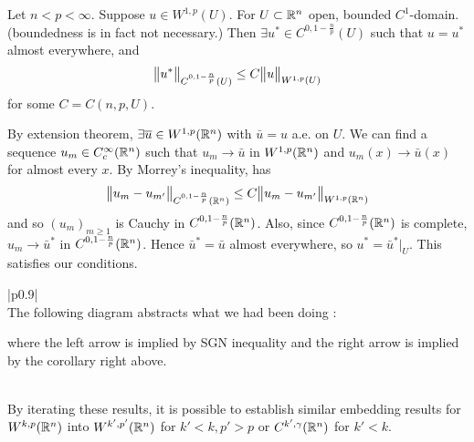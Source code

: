 \documentclass[12pt,a4paper]{report}
\newenvironment{proof}
{\begin{changemargin}{1cm}{0.5cm} 
	}%
	{\end{changemargin}
}
\begin{document}
\corr Let $n< p < \infty$. Suppose $u \in W^{1,p} (U)$. For $U\subset \mathbb{R}^n$ open, bounded $C^{1}$-domain. (boundedness is in fact not necessary.) Then $\exists u^* \in C^{0,1-\frac{n}{p}}(U)$ such that $u = u^*$ almost everywhere, and
\begin{align*}
\bigl\lVert u^*\bigr\rVert_{C^{0,1-\frac{n}{p}}(U)} \leq C \bigl\lVert u\bigr\rVert_{W^{1,p}(U)}
\end{align*}
for some $C = C(n,p,U)$.
\begin{proof}
\pf By extension theorem, $\exists \overline{u} \in W^{1,p}(\mathbb{R}^n)$ with $\bar{u} =u$ a.e. on $U$. We can find a sequence $u_m \in C_c^{\infty}(\mathbb{R}^n)$ such that $u_m \rightarrow \bar{u}$ in $W^{1,p}(\mathbb{R}^n)$ and $u_m(x) \rightarrow \bar{u}(x)$ for almost every $x$. By Morrey's inequality, has
\begin{align*}
\bigl\lVert u_m -u_{m'}\bigr\rVert_{C^{0,1-\frac{n}{p}}(\mathbb{R}^n)} \leq C \bigl\lVert u_m - u_{m'}\bigr\rVert_{W^{1,p}(\mathbb{R}^n)}
\end{align*}
and so $(u_m)_{m\geq 1}$ is Cauchy in $C^{0, 1-\frac{n}{p}}(\mathbb{R}^n)$. Also, since $C^{0, 1-\frac{n}{p}}(\mathbb{R}^n)$ is complete, $u_m \rightarrow \bar{u}^*$ in $C^{0,1-\frac{n}{p}}(\mathbb{R}^n)$. Hence $\bar{u}^* = \bar{u}$ almost everywhere, so $u^* = \bar{u}^* \big|_{U}$. This satisfies our conditions.

\eop
\end{proof}
\s

\begin{tabular}{|p{}|}
\hline\\
The following diagram abstracts what we had been doing :

\begin{center}
\begin{large}
\end{large}
\end{center}
where the left arrow is implied by SGN inequality and the right arrow is implied by the corollary right above.
\\\\\hline
\end{tabular}
\s

By iterating these results, it is possible to establish similar embedding results for $W^{k,p}(\mathbb{R}^n)$ into $W^{k',p'}(\mathbb{R}^n)$ for $k'<k, p'>p$ or $C^{k',\gamma}(\mathbb{R}^n)$ for $k'<k$.
\s
\end{document}
